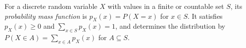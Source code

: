 
For a discrete random variable $X$ with values in a finite or countable set $S$, its \emph{probability mass function} is $p_X(x)=P(X=x)$ for $x\in S$. It satisfies $p_X(x)\ge0$ and $\sum_{x\in S}p_X(x)=1$, and determines the distribution by $P(X\in A)=\sum_{x\in A}p_X(x)$ for $A\subseteq S$.
